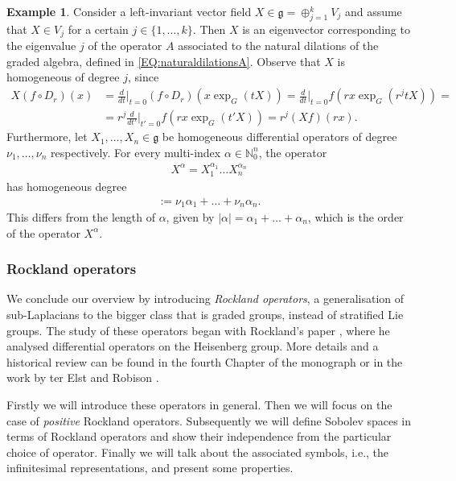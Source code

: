 \documentclass[12pt,oneside,a4paper]{book}
\numberwithin{equation}{section}     %
\theoremstyle{plain}
\theoremstyle{definition}
\newtheorem{example}[theorem]{Example}
\newcommand{\N}{{\mathbb N}}
\begin{document}
\begin{example}
	Consider a left-invariant vector field $X\in\mathfrak{g}=\oplus_{j=1}^k V_j$ and assume that $X\in V_j$ for a certain $j\in\{1,\dots,k\}$. Then $X$ is an eigenvector corresponding to the eigenvalue $j$ of the operator $A$ associated to the natural dilations of the graded algebra, defined in \eqref{EQ:naturaldilationsA}. Observe that $X$ is homogeneous of degree $j$, since
	\begin{align*}
	X(f\circ D_r)(x)&=\frac{d}{dt}\Bigr|_{t=0}(f\circ D_r)(x\exp_G(tX))=\frac{d}{dt}\Bigr|_{t=0}f(rx\exp_G(r^{j}tX))=\\
	&=r^{j}\frac{d}{dt'}\Bigr|_{t'=0}f(rx\exp_{G}(t'X))=r^j(Xf)(rx).
	\end{align*} 
	Furthermore, let $X_1, \dots,X_n\in \mathfrak{g}$ be homogeneous differential operators of degree $\nu_1,\dots,\nu_n$ respectively. For every multi-index $\alpha\in\N_0^n$, the operator
	\begin{align*}
	X^\alpha=X_1^{\alpha_1}\dots X_n^{\alpha_n}
	\end{align*}  
	has homogeneous degree
	\begin{align*}
	[\alpha]:=\nu_1\alpha_1+\dots+\nu_n\alpha_n.
	\end{align*}
	This differs from the length of $\alpha$, given by $|\alpha|=\alpha_1+\dots+\alpha_n$, which is the order of the operator $X^\alpha$.
\end{example}


\subsubsection{Rockland operators}\label{SectionRockland} 
We conclude our overview by introducing \textit{Rockland operators}, a generalisation of sub-Laplacians to the bigger class that is graded groups, instead of stratified Lie groups. The study of these operators began with Rockland's paper \cite{Rockland}, where he analysed differential operators on the Heisenberg group. More details and a historical review can be found in the fourth Chapter of the monograph \cite{FR2016} or in the work by ter Elst and Robison \cite{tER:97}.

Firstly we will introduce these operators in general. Then we will focus on the case of \textit{positive} Rockland operators. Subsequently we will define Sobolev spaces in terms of Rockland operators and show their independence from the particular choice of operator. Finally we will talk about the associated symbols, i.e., the infinitesimal representations, and present some properties.  
\end{document}
